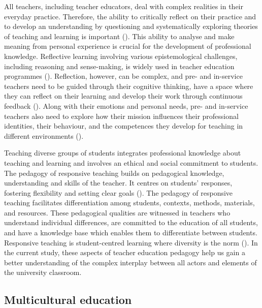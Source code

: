 \documentclass[output=paper]{langscibook}
\begin{document}
{All teachers, including teacher educators, deal with complex realities in their everyday practice. Therefore, the ability to critically reflect on their practice and to develop an understanding by questioning and systematically exploring theories of teaching and learning is important} (\citealt{Loughran2002,Watts2009-1}){. This ability to analyse and make meaning from personal experience is crucial for the development of professional knowledge. Reflective learning involving various epistemological challenges, including reasoning and sense-making, is widely used in teacher education programmes} (\citealt{Russell2017-1}){. Reflection, however, can be complex, and pre- and in-service teachers need to be guided through their cognitive thinking, have a space where they can reflect on their learning and develop their work through continuous feedback} (\citealt{Korthagen2010-1}){. Along with their emotions and personal needs, pre- and in-service teachers also need to explore how their mission influences their professional identities, their behaviour, and the competences they develop for teaching in different environments} (\citealt{Korthagen2010-1}){.}

{Teaching diverse groups of students integrates professional knowledge about teaching and learning and involves an ethical and social commitment to students. The pedagogy of responsive teaching builds on pedagogical knowledge, understanding and skills of the teacher. It centres on students’ responses, fostering flexibility and setting clear goals} (\citealt{Dozier2005-1}){. The pedagogy of responsive teaching facilitates differentiation among students, contexts, methods, materials, and resources. These pedagogical qualities are witnessed in teachers who understand individual differences, are committed to the education of all students, and have a knowledge base which enables them to differentiate between students. Responsive teaching is student-centred learning where diversity is the norm} (\citealt{Gujonsdottir2003-1,Gujonsdottir2016-1}){. In the current study, these aspects of  teacher education pedagogy help us gain a better understanding of the complex interplay between all actors and elements of the university classroom.}

\subsection{Multicultural education}
\end{document}
